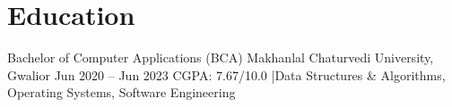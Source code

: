 \documentclass{resume}
\begin{document}
    \section{Education}
    
    \eduentry
      {Bachelor of Computer Applications (BCA)}
      {Makhanlal Chaturvedi University, Gwalior}
      {Jun 2020 -- Jun 2023}
      {CGPA: 7.67/10.0 \quad|\quad Data Structures \& Algorithms, Operating Systems, Software Engineering}
    
    
\end{document}

